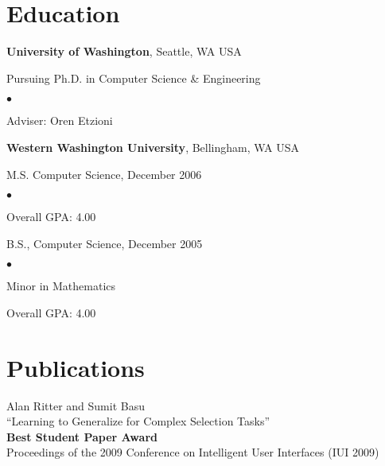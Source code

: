 \documentclass[margin,line]{res}
\newenvironment{list1}{
  \begin{list}{\ding{113}}{%
      \setlength{\itemsep}{0in}
      \setlength{\parsep}{0in} \setlength{\parskip}{0in}
      \setlength{\topsep}{0in} \setlength{\partopsep}{0in} 
      \setlength{\leftmargin}{0.17in}}}{\end{list}}
\newenvironment{list2}{
  \begin{list}{$\bullet$}{%
      \setlength{\itemsep}{0in}
      \setlength{\parsep}{0in} \setlength{\parskip}{0in}
      \setlength{\topsep}{0in} \setlength{\partopsep}{0in} 
      \setlength{\leftmargin}{0.2in}}}{\end{list}}
\begin{document}
\begin{resume}
\section{\sc Education}
{\bf University of Washington}, Seattle, WA USA\\
\vspace*{-.1in}
\begin{list1}
\item[] Pursuing Ph.D. in Computer Science \& Engineering
\begin{list2}
\vspace*{.05in}
\item Adviser: Oren Etzioni
\end{list2}
\end{list1}
{\bf Western Washington University}, Bellingham, WA USA\\
\vspace*{-.1in}
\begin{list1}
\item[] M.S. Computer Science, December 2006
\begin{list2}
\vspace*{.05in}
\item Overall GPA: 4.00
\end{list2}
\vspace*{.05in}
\item[] B.S., Computer Science,  December 2005
  \begin{list2}
    \vspace*{.05in}
    \item Minor in Mathematics
    \item Overall GPA: 4.00
  \end{list2}
\end{list1}

\section{\sc Publications}
Alan Ritter and Sumit Basu \\
``Learning to Generalize for Complex Selection Tasks'' \\
{\bf Best Student Paper Award} \\
Proceedings of the 2009 Conference on Intelligent User Interfaces (IUI 2009)


\end{resume}
\end{document}

